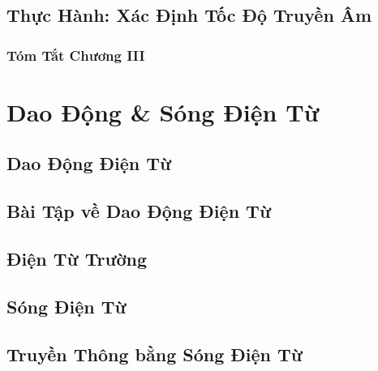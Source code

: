 \documentclass{article}
\numberwithin{equation}{section}
\begin{document}

\subsection{Thực Hành: Xác Định Tốc Độ Truyền Âm}


\subsubsection{Tóm Tắt Chương III}


\section{Dao Động \& Sóng Điện Từ}

\subsection{Dao Động Điện Từ}


\subsection{Bài Tập về Dao Động Điện Từ}


\subsection{Điện Từ Trường}


\subsection{Sóng Điện Từ}


\subsection{Truyền Thông bằng Sóng Điện Từ}
\end{document}
